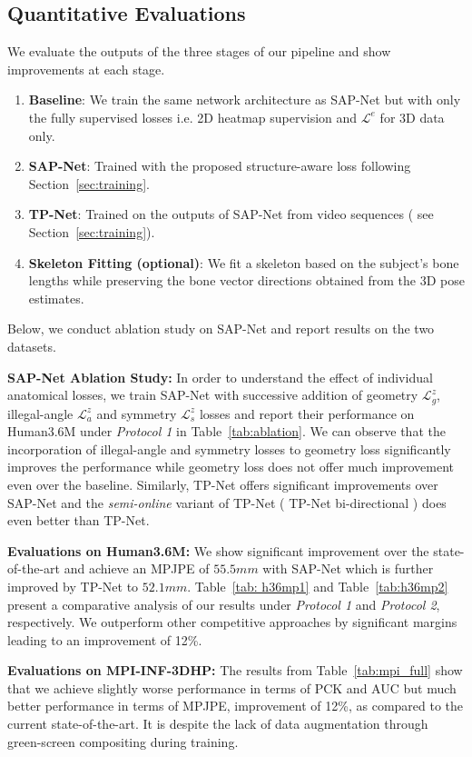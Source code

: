 \documentclass[runningheads]{llncs}
\begin{document}
\subsection{Quantitative Evaluations} \label{quanteval}
We evaluate the outputs of the three stages of our pipeline and show improvements at each stage.
\begin{enumerate}
    \item {\bf Baseline}: We train the same network architecture as SAP-Net but with only the fully supervised losses i.e. 2D heatmap supervision and $\mathcal{L}^e$ for 3D data only. 
    \item {\bf SAP-Net}: Trained with the proposed structure-aware loss following Section~\ref{sec:training}.
    \item {\bf TP-Net}: Trained on the outputs of SAP-Net from video sequences ( see Section~\ref{sec:training}).
    \item {\bf Skeleton Fitting (optional)}: We fit a skeleton based on the subject's bone lengths while preserving the bone vector directions obtained from the 3D pose estimates.
\end{enumerate}
Below, we conduct ablation study on SAP-Net and report results on the two datasets.

\textbf{SAP-Net Ablation Study:} In order to understand the effect of individual anatomical losses, we train SAP-Net with successive addition of geometry $\mathcal{L}^z_{g}$, illegal-angle $\mathcal{L}^z_{a}$ and symmetry $\mathcal{L}^z_{s}$ losses and report their performance on Human3.6M under {\it Protocol 1} in Table~\ref{tab:ablation}. We can observe that the incorporation of illegal-angle and symmetry losses to geometry loss significantly improves the performance while geometry loss does not offer much improvement even over the baseline. Similarly, TP-Net offers significant improvements over SAP-Net and the \emph{semi-online} variant of TP-Net ( TP-Net bi-directional ) does even better than TP-Net.

\textbf{Evaluations on Human3.6M:}
We show significant improvement over the state-of-the-art and achieve an MPJPE of $55.5mm$ with SAP-Net which is further improved by TP-Net to $52.1mm$. Table~\ref{tab: h36mp1} and Table~\ref{tab:h36mp2} present a comparative analysis of our results under \textit{Protocol 1} and \textit{Protocol 2}, respectively. We outperform other competitive approaches by significant margins leading to an improvement of 12\%. 

\textbf{Evaluations on MPI-INF-3DHP:}
The results from Table~\ref{tab:mpi_full} show that we achieve slightly worse performance in terms of PCK and AUC but much better performance in terms of MPJPE, improvement of 12\%, as compared to the current state-of-the-art. It is despite the lack of data augmentation through green-screen compositing during training. 
\end{document}
